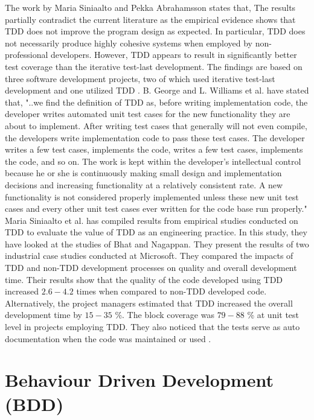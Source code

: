 \documentclass[conference, onecolumn, a4, 12pt]{IEEEtran}
\begin{document}
The work by Maria Siniaalto and Pekka Abrahamsson states that, The results partially contradict the current literature as the empirical evidence shows that TDD does not improve the program design as expected. In particular, TDD does not necessarily produce highly cohesive systems when employed by non-professional developers. However, TDD appears to result in significantly better test coverage than the iterative test-last development. The findings are based on three software development projects, two of which used iterative test-last development and one utilized TDD \cite{b6}.\newline
B. George and L. Williams et al. have stated that, "..we find the definition of TDD as, before writing implementation code, the developer writes automated unit test cases for the new functionality they are about to implement. After writing test cases that generally will not even compile, the developers write implementation code to pass these test cases. The developer writes a few test cases, implements the code, writes a few test cases, implements the code, and so on. The work is kept within the developer’s intellectual control because he or she is continuously making small design and implementation decisions and increasing functionality at a relatively consistent rate. A new functionality is not considered properly implemented unless these new unit test cases and every other unit test cases ever written for the code base run properly." \cite{c1} Maria Siniaalto et al. has compiled results from empirical studies conducted on TDD to evaluate the value of TDD as an engineering practice. In this study, they have looked at the studies of Bhat and Nagappan. They present the results of two industrial case studies conducted at Microsoft. They compared the impacts of TDD and non-TDD development processes on quality and overall development time. Their results show that the quality of the code developed using TDD increased $2.6-4.2$ times when compared to non-TDD developed code. Alternatively, the project managers estimated that TDD increased the overall development time by $15-35$ \%. The block coverage was $79-88$ \% at unit test level in projects employing TDD. They also noticed that the tests serve as auto documentation when the code was maintained or used \cite{c2}.\newline

\section{Behaviour Driven Development (BDD)}
\end{document}
